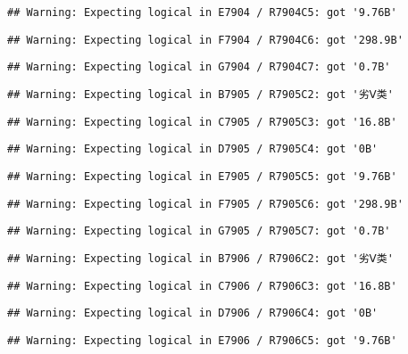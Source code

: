 \documentclass[
]{article}
\begin{document}
\begin{verbatim}
## Warning: Expecting logical in E7904 / R7904C5: got '9.76B'
\end{verbatim}

\begin{verbatim}
## Warning: Expecting logical in F7904 / R7904C6: got '298.9B'
\end{verbatim}

\begin{verbatim}
## Warning: Expecting logical in G7904 / R7904C7: got '0.7B'
\end{verbatim}

\begin{verbatim}
## Warning: Expecting logical in B7905 / R7905C2: got '劣Ⅴ类'
\end{verbatim}

\begin{verbatim}
## Warning: Expecting logical in C7905 / R7905C3: got '16.8B'
\end{verbatim}

\begin{verbatim}
## Warning: Expecting logical in D7905 / R7905C4: got '0B'
\end{verbatim}

\begin{verbatim}
## Warning: Expecting logical in E7905 / R7905C5: got '9.76B'
\end{verbatim}

\begin{verbatim}
## Warning: Expecting logical in F7905 / R7905C6: got '298.9B'
\end{verbatim}

\begin{verbatim}
## Warning: Expecting logical in G7905 / R7905C7: got '0.7B'
\end{verbatim}

\begin{verbatim}
## Warning: Expecting logical in B7906 / R7906C2: got '劣Ⅴ类'
\end{verbatim}

\begin{verbatim}
## Warning: Expecting logical in C7906 / R7906C3: got '16.8B'
\end{verbatim}

\begin{verbatim}
## Warning: Expecting logical in D7906 / R7906C4: got '0B'
\end{verbatim}

\begin{verbatim}
## Warning: Expecting logical in E7906 / R7906C5: got '9.76B'
\end{verbatim}
\end{document}
